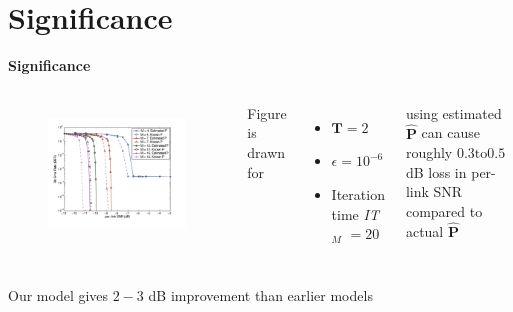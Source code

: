 \documentclass{beamer}
\begin{document}
\section{Significance}
\begin{frame}{\textbf{Significance}}
\begin{columns}[onlytextwidth]

    \begin{figure}
        \centering
        \includegraphics[scale=0.4]{figures/Ber-Performance.png}
        \label{fig:berPerformance}
    \end{figure}
    
    Figure is drawn for 
    \begin{itemize}
        \item $\mathbf{T}=2$
        \item $\epsilon=10^{-6}$
        \item Iteration time \textit{IT}$_M$ $=20$
    \end{itemize} 

    \begin{block}{}
     using estimated $\mathbf{\hat{P}}$ can cause roughly $0.3 \text{to} 0.5$ dB loss in per-link SNR compared to actual $\mathbf{\hat{P}}$
    \end{block}
\end{columns}

\begin{block}{}
Our model gives $2 - 3 $ dB improvement than earlier models 
\end{block}
\end{frame}
\end{document}
